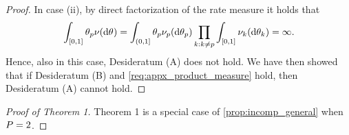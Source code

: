 \begin{proof}
In case (ii), by direct factorization of the rate measure it holds that
\[
	\int_{[0,1]}\variantfreqperpop{\popidx}\levync(\de\vecvariantfreq{}) = \int_{(0,1]}\variantfreqperpop{\popidx} \levync_{\popidx}(\de\variantfreqperpop{\popidx}) \prod_{k: k\ne \popidx} \int_{[0,1]}\levync_{k}(\de\variantfreqperpop{k})=\infty.
 \] 
Hence, also in this case, Desideratum (A) does not hold. We have then showed that if Desideratum (B) and \cref{req:appx_product_measure} hold, then Desideratum (A) cannot hold.

\end{proof}

\begin{proof}[Proof of Theorem 1]
	Theorem 1 is a special case of \cref{prop:incomp_general} when $P = 2$. 
\end{proof}


